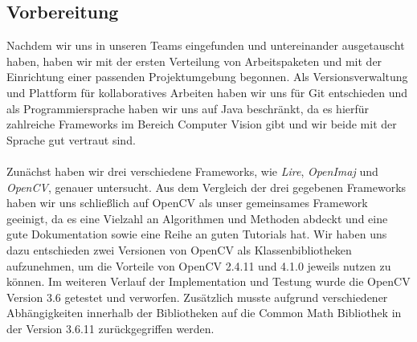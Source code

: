 \documentclass{scrartcl}
\begin{document}
\subsection{Vorbereitung}
Nachdem wir uns in unseren Teams eingefunden und untereinander ausgetauscht haben, haben wir mit der ersten Verteilung von Arbeitspaketen und mit der Einrichtung einer passenden Projektumgebung begonnen. Als Versionsverwaltung und Plattform für kollaboratives Arbeiten haben wir uns für Git entschieden und als Programmiersprache haben wir uns auf Java beschränkt, da es hierfür zahlreiche Frameworks im Bereich Computer Vision gibt und wir beide mit der Sprache gut vertraut sind. 
\\
\\
Zunächst haben wir drei verschiedene Frameworks, wie \textit{Lire}, \textit{OpenImaj} und \textit{OpenCV}, genauer untersucht. Aus dem Vergleich der drei gegebenen Frameworks haben wir uns schließlich auf OpenCV als unser gemeinsames Framework geeinigt, da es eine Vielzahl an Algorithmen und Methoden abdeckt und eine gute Dokumentation sowie eine Reihe an guten Tutorials hat. Wir haben uns dazu entschieden zwei Versionen von OpenCV als Klassenbibliotheken aufzunehmen, um die Vorteile von OpenCV 2.4.11 und 4.1.0 jeweils nutzen zu können. Im weiteren Verlauf der Implementation und Testung wurde die OpenCV Version 3.6 getestet und verworfen. Zusätzlich musste aufgrund verschiedener Abhängigkeiten innerhalb der Bibliotheken auf die Common Math Bibliothek in der Version 3.6.11 zurückgegriffen werden.
\end{document}
